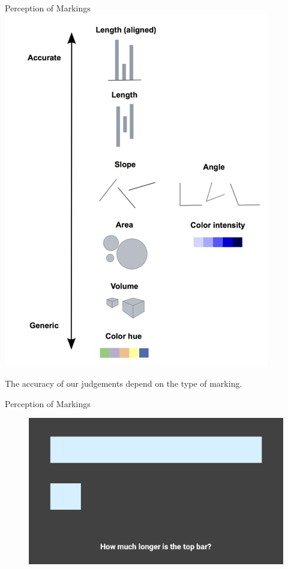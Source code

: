 \documentclass[aspectratio=169]{../latex_main/tntbeamer}  %
\begin{document}
	
	
	\begin{frame}{Perception of Markings}
	        \centering
	        \includegraphics[scale=.35]{Bild70}

	    The accuracy of our judgements depend on the type of marking.

	\end{frame}
	
	
	\begin{frame}{Perception of Markings}
	    \begin{figure}
	        \centering
	        \includegraphics[scale=.4]{Bild71}
	    \end{figure}
	\end{frame}
	
\end{document}
